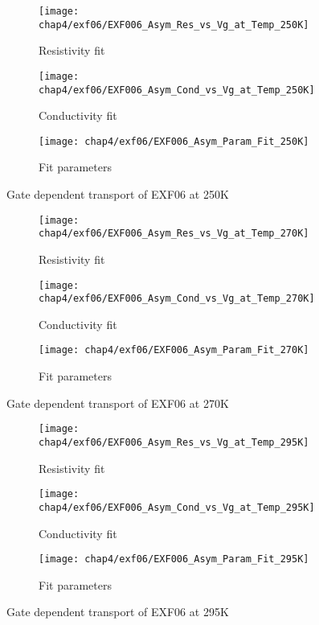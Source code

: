 \documentclass[../Matt_Gebert_Honours_Thesis.tex]{subfiles}
\begin{document}
	\begin{figure}[H]
		\centering
		\begin{subfigure}{0.4\textwidth}
			\centering
			\texttt{[image: chap4/exf06/EXF006\_Asym\_Res\_vs\_Vg\_at\_Temp\_250K]}
			\caption{Resistivity fit}
		\end{subfigure}
		\begin{subfigure}{0.4\textwidth}
			\centering
			\texttt{[image: chap4/exf06/EXF006\_Asym\_Cond\_vs\_Vg\_at\_Temp\_250K]}
			\caption{Conductivity fit}
		\end{subfigure}
		\begin{subfigure}{0.16\textwidth}
			\centering
			\texttt{[image: chap4/exf06/EXF006\_Asym\_Param\_Fit\_250K]}
			\caption{Fit parameters}
		\end{subfigure}
		\caption*{Gate dependent transport of EXF06 at 250K}
	\end{figure}
	\begin{figure}[H]
		\centering
		\begin{subfigure}{0.4\textwidth}
			\centering
			\texttt{[image: chap4/exf06/EXF006\_Asym\_Res\_vs\_Vg\_at\_Temp\_270K]}
			\caption{Resistivity fit}
		\end{subfigure}
		\begin{subfigure}{0.4\textwidth}
			\centering
			\texttt{[image: chap4/exf06/EXF006\_Asym\_Cond\_vs\_Vg\_at\_Temp\_270K]}
			\caption{Conductivity fit}
		\end{subfigure}
		\begin{subfigure}{0.16\textwidth}
			\centering
			\texttt{[image: chap4/exf06/EXF006\_Asym\_Param\_Fit\_270K]}
			\caption{Fit parameters}
		\end{subfigure}
		\caption*{Gate dependent transport of EXF06 at 270K}
	\end{figure}
	\begin{figure}[H]
		\centering
		\begin{subfigure}{0.4\textwidth}
			\centering
			\texttt{[image: chap4/exf06/EXF006\_Asym\_Res\_vs\_Vg\_at\_Temp\_295K]}
			\caption{Resistivity fit}
		\end{subfigure}
		\begin{subfigure}{0.4\textwidth}
			\centering
			\texttt{[image: chap4/exf06/EXF006\_Asym\_Cond\_vs\_Vg\_at\_Temp\_295K]}
			\caption{Conductivity fit}
		\end{subfigure}
		\begin{subfigure}{0.16\textwidth}
			\centering
			\texttt{[image: chap4/exf06/EXF006\_Asym\_Param\_Fit\_295K]}
			\caption{Fit parameters}
		\end{subfigure}
		\caption*{Gate dependent transport of EXF06 at 295K}
	\end{figure}
\end{document}
